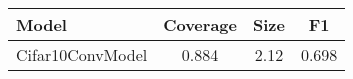 \begin{table}[t] 
\centering 
\small 
\begin{tabular}{lccc} 
\toprule 
Model & Coverage & Size & F1 \\ 
\midrule 
Cifar10ConvModel & 0.884 & 2.12 & 0.698  \\ 
\bottomrule 
\end{tabular} 
\end{table} 
